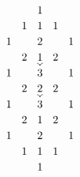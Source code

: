\documentclass[border={10pt 10pt 10pt 10pt},varwidth]{standalone}
\begin{document}
\[\begin{tikzcd}[row sep={5mm,between origins},column sep={5mm,between origins},cramped]
	&& 1&& \\%
	& 1 & 1 & 1 \\
	1 && 2 & {} & 1 \\
	& 2 & 1 & 2 \\
	1 && 3 && 1 \\
	& 2 & 2 & 2 \\
	1 && 3 && 1 \\
	& 2 & 1 & 2 \\
	1 && 2 && 1 \\
	& 1 & 1 & 1 \\
	&& 1
	\arrow[from=4-3, to=5-3]
	\arrow[from=6-3, to=7-3]
\end{tikzcd}\]
\end{document}
